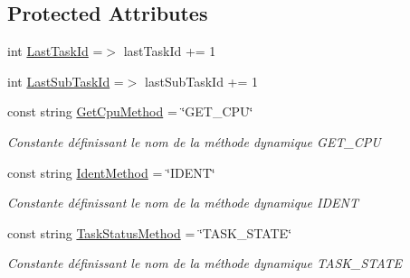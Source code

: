 \subsection*{Protected Attributes}
\begin{DoxyCompactItemize}
\item 
int \hyperlink{class_node_net_1_1_network_1_1_nodes_1_1_node_a9cf33be57e8a56ddc74c0b0de273b0fd}{Last\+Task\+Id} =$>$ last\+Task\+Id += 1
\item 
int \hyperlink{class_node_net_1_1_network_1_1_nodes_1_1_node_a561c7a0f3007f3756bba7287acfdaa29}{Last\+Sub\+Task\+Id} =$>$ last\+Sub\+Task\+Id += 1
\item 
const string \hyperlink{class_node_net_1_1_network_1_1_nodes_1_1_node_a2a85fc9362ff97017a87f69a80bbcba7}{Get\+Cpu\+Method} = \char`\"{}G\+E\+T\+\_\+\+C\+PU\char`\"{}
\begin{DoxyCompactList}\small\item\em Constante définissant le nom de la méthode dynamique G\+E\+T\+\_\+\+C\+PU \end{DoxyCompactList}\item 
const string \hyperlink{class_node_net_1_1_network_1_1_nodes_1_1_node_a27653c0191f2917a6b3ca40713d609db}{Ident\+Method} = \char`\"{}I\+D\+E\+NT\char`\"{}
\begin{DoxyCompactList}\small\item\em Constante définissant le nom de la méthode dynamique I\+D\+E\+NT \end{DoxyCompactList}\item 
const string \hyperlink{class_node_net_1_1_network_1_1_nodes_1_1_node_a5c5ce25d72d61f0a1631461cb04cf004}{Task\+Status\+Method} = \char`\"{}T\+A\+S\+K\+\_\+\+S\+T\+A\+TE\char`\"{}
\begin{DoxyCompactList}\small\item\em Constante définissant le nom de la méthode dynamique T\+A\+S\+K\+\_\+\+S\+T\+A\+TE \end{DoxyCompactList}\end{DoxyCompactItemize}
